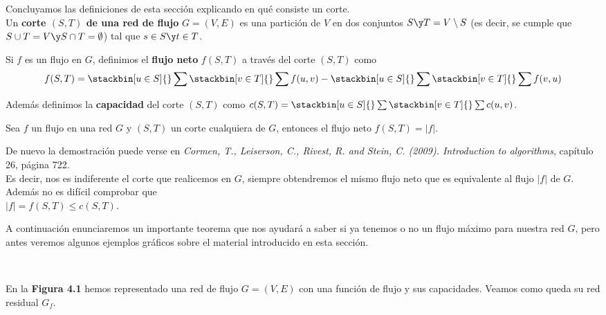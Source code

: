 \begin{defi} Concluyamos las definiciones de esta sección explicando en qué consiste un corte.\\
Un \textbf{corte $(S,T)$ de una red de flujo} $G=(V,E)$ es una partición de $V$ en dos conjuntos $S \y T=V\setminus S$ (es decir, se cumple que $S\cup T=V \y S\cap T=\emptyset$) tal que $s\in S\y t\in T$.

Si $f$ es un flujo en $G$, definimos el \textbf{flujo neto} $f(S,T)$ a través del corte $(S,T)$ como
\[f(S,T)=\stackbin[u\in S]{}\sum\stackbin[v\in T]{}\sum f(u,v)-\stackbin[u\in S]{}\sum\stackbin[v\in T]{}\sum f(v,u)\]

Además definimos la \textbf{capacidad} del corte $(S,T)$ como $c(S,T)=\stackbin[u\in S]{}\sum\stackbin[v\in T]{}\sum c(u,v)$.
\end{defi}

\begin{proposicion} Sea $f$ un flujo en una red $G$ y $(S,T)$ un corte cualquiera de $G$, entonces el flujo neto $f(S,T)=|f|$.

De nuevo la demostración puede verse en \textit{Cormen, T., Leiserson, C., Rivest, R. and Stein, C. (2009). Introduction to algorithms}, capítulo 26, página 722.\\

Es decir, nos es indiferente el corte que realicemos en $G$, siempre obtendremos el mismo flujo neto que es equivalente al flujo $|f|$ de $G$. Además no es difícil comprobar que\\ $|f|=f(S,T)\leq c(S,T)$.
\end{proposicion}

A continuación enunciaremos un importante teorema que nos ayudará a saber si ya tenemos o no un flujo máximo para nuestra red $G$, pero antes veremos algunos ejemplos gráficos sobre el material introducido en esta sección.
\newpage
\begin{figura}\ \begin{center}\end{center}\end{figura}

En la \textbf{Figura 4.1} hemos representado una red de flujo $G=(V,E)$ con una función de flujo y sus capacidades. Veamos como queda su red residual $G_f$.

\begin{figura}\ \begin{center}\end{center}\end{figura}

